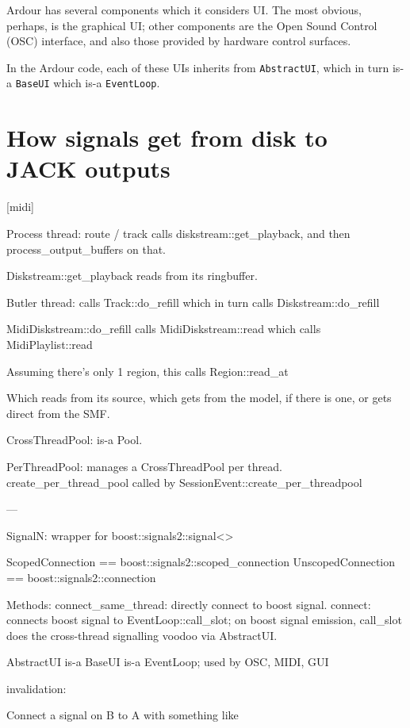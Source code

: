 \documentclass[10pt,a4paper]{book}
\newcommand{\code}[1]{\texttt{#1}}
\begin{document}
Ardour has several components which it considers UI\@.  The most
obvious, perhaps, is the graphical UI; other components are the Open
Sound Control (OSC) interface, and also those provided by hardware
control surfaces.

In the Ardour code, each of these UIs inherits from \code{AbstractUI},
which in turn is-a \code{BaseUI} which is-a \code{EventLoop}.



\section{How signals get from disk to JACK outputs}

[midi]

Process thread: route / track calls diskstream::get\_playback, and then process\_output\_buffers on that.

Diskstream::get\_playback reads from its ringbuffer.


Butler thread: calls Track::do\_refill which in turn calls Diskstream::do\_refill

MidiDiskstream::do\_refill calls MidiDiskstream::read which calls MidiPlaylist::read

Assuming there's only 1 region, this calls Region::read\_at

Which reads from its source, which gets from the model, if there is one, or gets direct from the SMF.




CrossThreadPool: is-a Pool.

PerThreadPool: manages a CrossThreadPool per thread.  create\_per\_thread\_pool
called by SessionEvent::create\_per\_thread\-pool


---



SignalN: wrapper for boost::signals2::signal<>

ScopedConnection == boost::signals2::scoped\_connection
UnscopedConnection == boost::signals2::connection

Methods:
connect\_same\_thread: directly connect to boost signal.
connect: connects boost signal to EventLoop::call\_slot; on boost signal emission, call\_slot
does the cross-thread signalling voodoo via AbstractUI.

AbstractUI is-a BaseUI is-a EventLoop; used by OSC, MIDI, GUI

invalidation:

Connect a signal on B to A with something like
\end{document}
